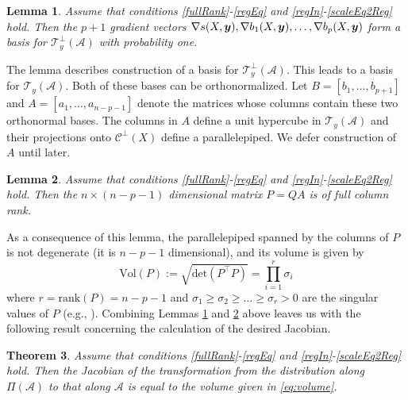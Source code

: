 \documentclass[12pt]{article}
\newcommand{\by}{\mbox{\boldmath $y$}}
\newcommand{\mc}{\mathcal}
\newtheorem{theorem}{Theorem}[section]
\newtheorem{lemma}[theorem]{\bf Lemma}
\begin{document}
\begin{lemma}
\label{lem:basis}
Assume that conditions \ref{fullRank}-\ref{regEq} and \ref{regIn}-\ref{scaleEq2Reg} hold.  Then the $p+1$ gradient vectors 
$\nabla s(X,\by), \nabla b_1(X,\by),\dots, \nabla b_p(X,\by)$ form a
basis for $\mc T_{y}^\perp(\mc A)$ with probability one.
\end{lemma}

The lemma describes construction of a basis for $\mc T_{y}^\perp(\mc A)$.  This leads to a 
basis for $\mc T_{y}(\mc A)$.  Both of these bases can be orthonormalized.  
Let $B=[b_1,\dots,b_{p+1}]$ and $A=[a_{1},\dots,a_{n-p-1}]$ denote the 
matrices whose columns contain these two orthonormal bases.  
The columns in $A$ define a unit hypercube in $\mc T_{y}(\mc
  A)$ and their projections onto $\mc{C}^\perp(X)$ define a parallelepiped.
We defer construction of $A$ until later.  

\begin{lemma}
\label{lem:fullrank}
Assume that conditions \ref{fullRank}-\ref{regEq} and \ref{regIn}-\ref{scaleEq2Reg} hold.  
Then the $n\times (n-p-1)$ dimensional matrix $P=QA$ is of full column rank.
\end{lemma}

As a consequence of this lemma, 
the parallelepiped spanned by the columns of $P$ is not
degenerate (it is $n-p-1$ dimensional), and its volume
is given by
\begin{equation}
\label{eq:volume}
\text{Vol} (P) := \sqrt{\text{det}(P^\top P)}=\prod_{i=1}^{r} \sigma_i
\end{equation}
where $r=\text{rank} (P)=n-p-1$ and $\sigma_1\geq
\sigma_2\geq\dots\geq\sigma_r>0$ are the singular values of $P$ (e.g.,
\cite{miao1992}). 
Combining Lemmas \ref{lem:basis} and \ref{lem:fullrank} above leaves us with the following result concerning the calculation of the desired Jacobian.  
\begin{theorem}
\label{Jacobian}
Assume that conditions \ref{fullRank}-\ref{regEq} and \ref{regIn}-\ref{scaleEq2Reg} hold.  Then the
Jacobian of the transformation from the distribution along 
$\Pi(\mc A)$ to that along $\mc A $ is equal to the volume given in \eqref{eq:volume}.
\end{theorem}
\end{document}
